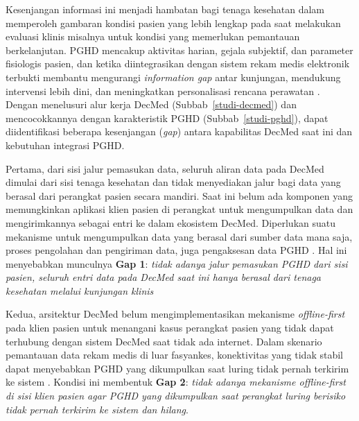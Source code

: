 Kesenjangan informasi ini menjadi hambatan bagi tenaga kesehatan dalam memperoleh gambaran kondisi pasien yang lebih lengkap pada saat melakukan evaluasi klinis misalnya untuk kondisi yang memerlukan pemantauan berkelanjutan.
PGHD mencakup aktivitas harian, gejala subjektif, dan parameter fisiologis pasien, dan ketika diintegrasikan dengan sistem rekam medis elektronik terbukti membantu mengurangi \textit{information gap} antar kunjungan, mendukung intervensi lebih dini, dan meningkatkan personalisasi rencana perawatan \parencite{Tiase2020-PGHD_EHR_Integration,Cohen_Keller_Hayes_Dorr_Ash_Sittig_2016_PGHD_Integration_EHR,Mars_Scott_2022_PGHD_Healthcare}. 
Dengan menelusuri alur kerja DecMed (Subbab~\ref{studi-decmed}) dan mencocokkannya dengan karakteristik PGHD (Subbab~\ref{studi-pghd}), dapat diidentifikasi beberapa kesenjangan (\textit{gap}) antara kapabilitas DecMed saat ini dan kebutuhan integrasi PGHD\@.

Pertama, dari sisi jalur pemasukan data, seluruh aliran data pada DecMed dimulai dari sisi tenaga kesehatan dan tidak menyediakan jalur bagi data yang berasal dari perangkat pasien secara mandiri. 
Saat ini belum ada komponen yang memungkinkan aplikasi klien pasien di perangkat untuk mengumpulkan data dan mengirimkannya sebagai entri ke dalam ekosistem DecMed. 
Diperlukan suatu mekanisme untuk mengumpulkan data yang berasal dari sumber data mana saja, proses pengolahan dan pengiriman data, juga pengaksesan data PGHD \parencite{Zeng2022-Standardized-PGD}.
Hal ini menyebabkan munculnya \textbf{Gap 1}: \emph{tidak adanya jalur pemasukan PGHD dari sisi pasien, seluruh entri data pada DecMed saat ini hanya berasal dari tenaga kesehatan melalui kunjungan klinis}

Kedua, arsitektur DecMed belum mengimplementasikan mekanisme \textit{offline-first} pada klien pasien untuk menangani kasus perangkat pasien yang tidak dapat terhubung dengan sistem DecMed saat tidak ada internet. 
Dalam skenario pemantauan data rekam medis di luar fasyankes, konektivitas yang tidak stabil dapat menyebabkan PGHD yang dikumpulkan saat luring tidak pernah terkirim ke sistem \parencite{Khatiwada_Yang_Lin_Blobel_2024_PGHD_Understanding}.
Kondisi ini membentuk \textbf{Gap 2}: \emph{tidak adanya mekanisme \textit{offline-first} di sisi klien pasien agar PGHD yang dikumpulkan saat perangkat luring berisiko tidak pernah terkirim ke sistem dan hilang}.

